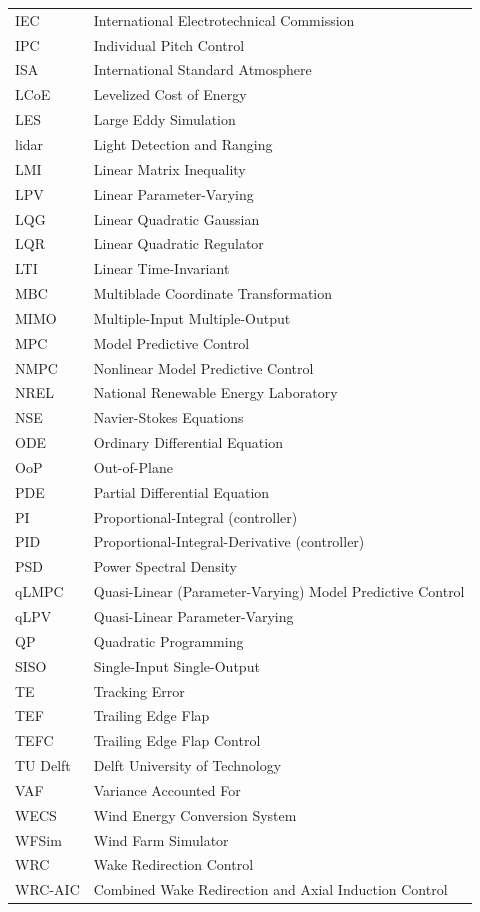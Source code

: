 \begin{longtable}{ll}
    {IEC} & {International Electrotechnical Commission} \\
    {IPC} & {Individual Pitch Control} \\
    {ISA} & {International Standard Atmosphere} \\
    {LCoE} & {Levelized Cost of Energy} \\
    {LES} & {Large Eddy Simulation} \\
    {lidar} & {Light Detection and Ranging}\\
    {LMI} & {Linear Matrix Inequality} \\
    {LPV} & {Linear Parameter-Varying} \\
    {LQG} & {Linear Quadratic Gaussian}\\
    {LQR} & {Linear Quadratic Regulator}\\
    {LTI} & {Linear Time-Invariant} \\
    {MBC} & {Multiblade Coordinate Transformation}\\
    {MIMO} & {Multiple-Input Multiple-Output} \\
    {MPC} & {Model Predictive Control} \\
    {NMPC} & {Nonlinear Model Predictive Control} \\
    {NREL} & {National Renewable Energy Laboratory} \\
    {NSE} & {Navier-Stokes Equations}\\
    {ODE} & {Ordinary Differential Equation}\\
    {OoP} & {Out-of-Plane}\\
    {PDE} & {Partial Differential Equation}\\
    {PI}  & {Proportional-Integral (controller)}\\
    {PID}  & {Proportional-Integral-Derivative (controller)}\\
    {PSD}  & {Power Spectral Density}\\
    {qLMPC}  & {Quasi-Linear (Parameter-Varying) Model Predictive Control}\\
    {qLPV}  & {Quasi-Linear Parameter-Varying}\\
    {QP}  & {Quadratic Programming}\\
    {SISO} & {Single-Input Single-Output} \\
    {TE} & {Tracking Error} \\
    {TEF} & {Trailing Edge Flap} \\
    {TEFC} & {Trailing Edge Flap Control}\\
    {TU Delft} & {Delft University of Technology} \\
    {VAF} & {Variance Accounted For}\\
    {WECS} & {Wind Energy Conversion System} \\
    {WFSim} & {Wind Farm Simulator} \\
    {WRC} & {Wake Redirection Control} \\
    {WRC-AIC} & {Combined Wake Redirection and Axial Induction Control} \\
\end{longtable}
\endgroup